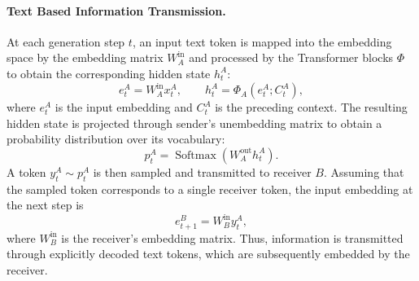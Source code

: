 \documentclass[11pt]{article}
\begin{document}
\paragraph{Text Based Information Transmission.}
At each generation step \(t\), an input text token is mapped into the embedding space by the embedding matrix \(W^{\mathrm{in}}_A\) and processed by the Transformer blocks \(\Phi\) to obtain the corresponding hidden state $h_t^A$:
\begin{equation}
    e_t^A = W_A^{\mathrm{in}}x_t^A,
    \qquad
    h_t^A = \Phi_A(e_t^A; C_t^A),
    \label{eq:text_encoding}
\end{equation}
where $e_t^A$ is the input embedding and $C_t^A$ is the preceding context. The resulting hidden state is projected through sender's unembedding matrix to obtain a probability distribution over its vocabulary:
\begin{equation}
    p_t^A
    =
    \operatorname{Softmax}
    \left(
        W_A^{\mathrm{out}}h_t^A
    \right).
    \label{eq:text_decoding}
\end{equation}
A token $y_t^A \sim p_t^A$ is then sampled and transmitted to receiver $B$. Assuming that the sampled token corresponds to a single receiver token, the input embedding at the next step is
\begin{equation}
    e_{t+1}^B
    =
    W_B^{\mathrm{in}}y_t^A,
    \label{eq:text_transmission}
\end{equation}
where $W_B^{\mathrm{in}}$ is the receiver's embedding matrix.
Thus, information is transmitted through explicitly decoded text tokens, which are subsequently embedded by the receiver.

\end{document}
